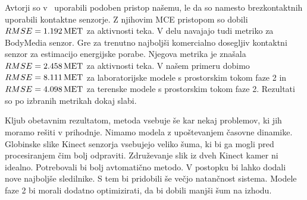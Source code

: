 Avtorji so v~\cite{gjoreski2015context} uporabili podoben pristop našemu, le da so namesto brezkontaktnih uporabili kontaktne senzorje. Z njihovim MCE pristopom so dobili ${RMSE}=\SI{1.192}{MET}$ za aktivnosti teka. V delu navajajo tudi metriko za BodyMedia senzor. Gre za trenutno najboljši komercialno dosegljiv kontaktni senzor za estimacijo energijske porabe. Njegova metrika je znašala ${RMSE}=\SI{2.458}{MET}$ za aktivnosti teka. V našem primeru dobimo ${RMSE}=\SI{8.111}{MET}$ za laboratorijske modele s prostorskim tokom faze 2 in ${RMSE}=\SI{4.098}{MET}$ za terenske modele s prostorskim tokom faze 2. Rezultati so po izbranih metrikah dokaj slabi. 

Kljub obetavnim rezultatom, metoda vsebuje še kar nekaj problemov, ki jih moramo rešiti v prihodnje. Nimamo modela z upoštevanjem časovne dinamike. Globinske slike Kinect senzorja vsebujejo veliko šuma, ki bi ga mogli pred procesiranjem čim bolj odpraviti. Združevanje slik iz dveh Kinect kamer ni idealno. Potrebovali bi bolj avtomatično metodo. V postopku bi lahko dodali nove najboljše sledilnike. S tem bi pridobili še večjo natančnost sistema. Modele faze 2 bi morali dodatno optimizirati, da bi dobili manjši šum na izhodu.
